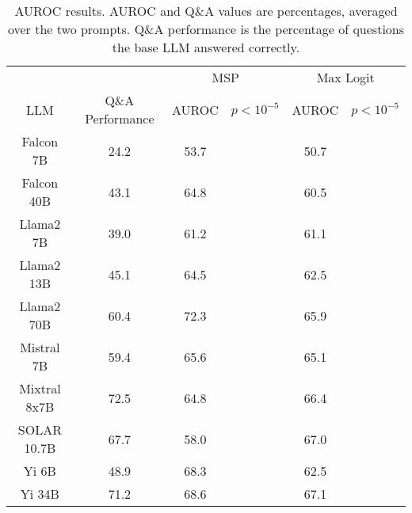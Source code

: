 \begin{table*}
\centering
\begin{tabular}{c|c|c|c|c|c}
& & \multicolumn{2}{c|}{MSP} & \multicolumn{2}{c}{Max Logit} \\ 
LLM & Q\&A Performance & AUROC & $p < 10^{-5}$ & AUROC & $p < 10^{-5}$\\ \hline
Falcon 7B & 24.2 & 53.7 &  & 50.7 & \\
Falcon 40B & 43.1 & 64.8 &  & 60.5 & \\
Llama2 7B & 39.0 & 61.2 &  & 61.1 & \\
Llama2 13B & 45.1 & 64.5 &  & 62.5 & \\
Llama2 70B & 60.4 & 72.3 &  & 65.9 & \\
Mistral 7B & 59.4 & 65.6 &  & 65.1 & \\
Mixtral 8x7B & 72.5 & 64.8 &  & 66.4 & \\
SOLAR 10.7B & 67.7 & 58.0 &  & 67.0 & \\
Yi 6B & 48.9 & 68.3 &  & 62.5 & \\
Yi 34B & 71.2 & 68.6 &  & 67.1 & \\
\hline
\end{tabular}
\caption{AUROC results. AUROC and Q\&A values are percentages, averaged over the two prompts. Q\&A performance is the percentage of questions the base LLM answered correctly.}
\label{tab:auroc}
\end{table*}

